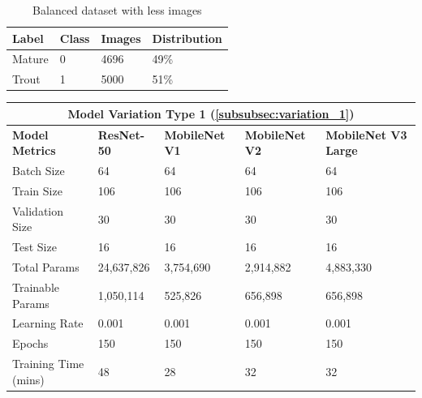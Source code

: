 \begin{table}[H]
\centering
\begin{tabularx}{\textwidth}{@{} *4{X} @{}}
\toprule
\textbf{Label} & \textbf{Class} & \textbf{Images} & \textbf{Distribution}\\
\midrule
    Mature     & 0 & 4696 & 49\%  \\[1.3ex]
    Trout    &  1 & 5000 & 51\% \\[1.3ex]
\bottomrule
\end{tabularx}
\caption{Balanced dataset with less images}
\label{table:data_type2}
\end{table}


\begin{table}[H]
\centering
\begin{tabularx}{\textwidth}{@{} *5{X} @{}}
\toprule
\multicolumn{5}{c}{\textbf{Model Variation Type 1 (\ref{subsubsec:variation_1})}}                                    \\ \midrule
\raggedright \textbf{Model Metrics}           & \textbf{ResNet-50}    & \textbf{MobileNet V1} & \textbf{MobileNet V2} & \textbf{MobileNet V3 Large} \\ \midrule
Batch Size                      &  64             & 64                &   64           &   64            \\ \midrule
Train Size                      & 106             &  106              &   106          &   106             \\  \midrule
Validation Size                 & 30              & 30                &   30           &   30            \\ \midrule
Test Size                       & 16              &  16               &   16           &   16            \\ \midrule
\raggedright Total Params       &  24,637,826     & 3,754,690         &   2,914,882    &   4,883,330                   \\ \midrule
\raggedright Trainable Params   &  1,050,114      & 525,826           &   656,898      &   656,898           \\ \midrule
Learning Rate                   & 0.001           & 0.001             &   0.001        &   0.001           \\ \midrule
Epochs                          &  150            & 150               &   150          &   150           \\ \midrule
Training Time (mins)            &  48             & 28                &   32           &   32           \\ \midrule

\end{tabularx}
\end{table}
